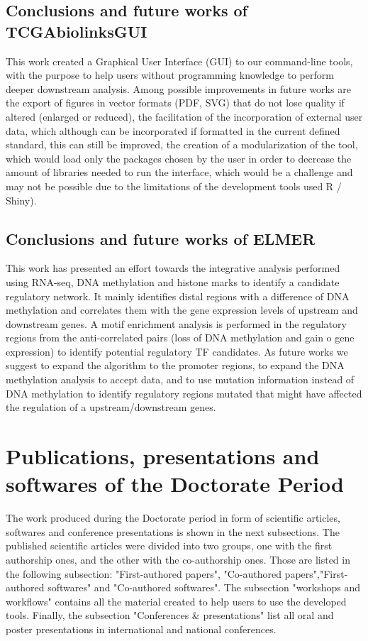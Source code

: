\subsection{Conclusions and future works of TCGAbiolinksGUI}

This work created a Graphical User Interface (GUI) to our command-line tools,
with the purpose to help users without programming knowledge to perform
deeper downstream analysis. Among possible improvements in future works are
the export of figures in vector formats (PDF, SVG) that do not lose quality
if altered (enlarged or reduced), the facilitation of the incorporation of external
user data, which although can be incorporated if formatted in the current defined standard,
this can still be improved, the creation of a modularization of the tool,
which would load only the packages chosen by the user in order to decrease the
amount of libraries needed to run the interface, which
would be a challenge and may not be possible due to the limitations of the development tools used R / Shiny).

\subsection{Conclusions and future works of ELMER}

This work has presented an effort towards the integrative analysis performed
using RNA-seq, DNA methylation and histone marks to identify a candidate regulatory network.
It mainly identifies distal regions with a difference of DNA methylation and correlates them
with the gene expression levels of upstream and downstream genes.
A motif enrichment analysis is performed in the regulatory regions from the anti-correlated
pairs (loss of DNA methylation and gain o gene expression) to identify potential
regulatory TF candidates. As future works we suggest to expand the algorithm to
the promoter regions, to expand the DNA methylation analysis to accept
 data,
 and to use mutation information instead of DNA methylation
to identify regulatory regions mutated that might have affected the
regulation of a upstream/downstream genes.


\section{Publications, presentations and softwares of the Doctorate Period}

The work produced during the Doctorate period in form of scientific articles,
softwares and conference presentations is shown in the next subsections.
The published scientific articles were divided into two groups, one with the  first authorship ones, and the other with the co-authorship ones. Those are listed in the following subsection: "First-authored papers", "Co-authored papers","First-authored softwares" and "Co-authored softwares".
The subsection "workshops and workflows" contains all the material created to help users to use the developed tools. Finally, the subsection "Conferences \& presentations" list all oral and poster presentations in international and national conferences.

